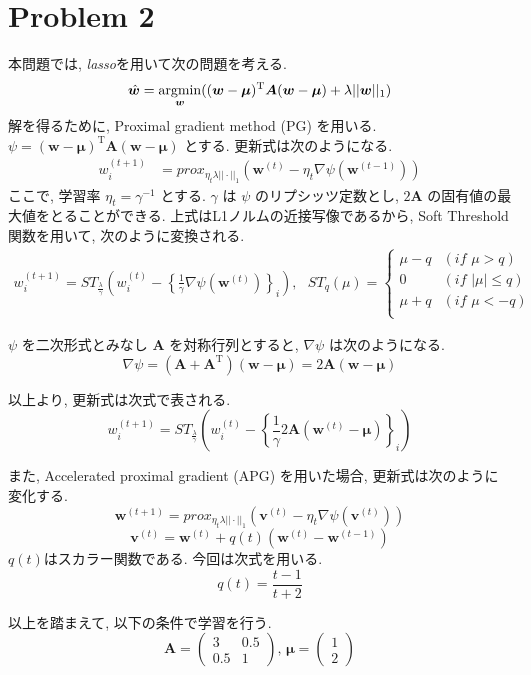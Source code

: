 \documentclass[a4paper,10pt]{jsarticle}
\newcommand{\argmin}{\mathop{\rm argmin}\limits}
\begin{document}
\section*{Problem 2}
本問題では, \textit{lasso}を用いて次の問題を考える.
\[
 \hat{\bm{w}} = \argmin_{\bm{w}}((\bm{w}-\bm{\mu})^\mathrm{T}\bm{A}(\bm{w}-\bm{\mu})
 + \lambda||\bm{w}||_1)
\]
解を得るために, Proximal gradient method (PG) を用いる.
$\psi = (\bm{w}-\bm{\mu})^\mathrm{T}\bm{A}(\bm{w}-\bm{\mu})$ とする.
更新式は次のようになる.
\begin{align*}
 w^{(t+1)}_i
 &= prox_{\eta_t\lambda||\cdot||_1}\left(\bm{w}^{(t)}
 - \eta_t\nabla\psi(\bm{w}^{(t-1)})\right)
\end{align*}
ここで, 学習率 $\eta_t=\gamma^{-1}$ とする.
$\gamma$ は $\psi$ のリプシッツ定数とし, $2\bm{A}$ の固有値の最大値をとることができる.
上式はL1ノルムの近接写像であるから, Soft Threshold関数を用いて, 次のように変換される.
\begin{align*}
 w^{(t+1)}_i
 = ST_{\frac{\lambda}{\gamma}}\left(w^{(t)}_i
 -\left\{\frac{1}{\gamma}\nabla\psi(\bm{w}^{(t)})\right\}_i\right),
 \,\,\,\,
 ST_q(\mu) = \begin{cases}
              \mu - q &(\mathit{if} \,\, \mu > q)\\
              0 &(\mathit{if} \,\, |\mu| \leq q)\\
              \mu + q &(\mathit{if} \,\, \mu < -q)\\
             \end{cases}
\end{align*}

$\psi$ を二次形式とみなし $\bm{A}$ を対称行列とすると, $\nabla \psi$ は次のようになる.
\[
 \nabla \psi = (\bm{A} + \bm{A}^\mathrm{T})(\bm{w} - \bm{\mu}) = 2\bm{A}(\bm{w} - \bm{\mu})
\]

以上より, 更新式は次式で表される.
\[
 w^{(t+1)}_i
 = ST_{\frac{\lambda}{\gamma}}\left(w^{(t)}_i
 -\left\{\frac{1}{\gamma}2\bm{A}(\bm{w}^{(t)} - \bm{\mu})\right\}_i\right)
\]

また, Accelerated proximal gradient (APG) を用いた場合, 更新式は次のように変化する.
\[
  \bm{w}^{(t+1)} = prox_{\eta_t\lambda||\cdot||_1}\left(
 \bm{v}^{(t)} - \eta_t\nabla\psi(\bm{v}^{(t)})\right)
\]
\[ \bm{v}^{(t)} = \bm{w}^{(t)} + q(t)(\bm{w}^{(t)} - \bm{w}^{(t-1)}) \]
$q(t)$はスカラー関数である. 今回は次式を用いる.
\[ q(t) = \frac{t-1}{t+2} \]

以上を踏まえて, 以下の条件で学習を行う.
\[
 \bm{A} = \left(\begin{array}{cc} 3 & 0.5 \\ 0.5 & 1 \end{array}\right), \,
 \bm{\mu} = \left(\begin{array}{c} 1 \\ 2 \end{array}\right)
\]
\end{document}
